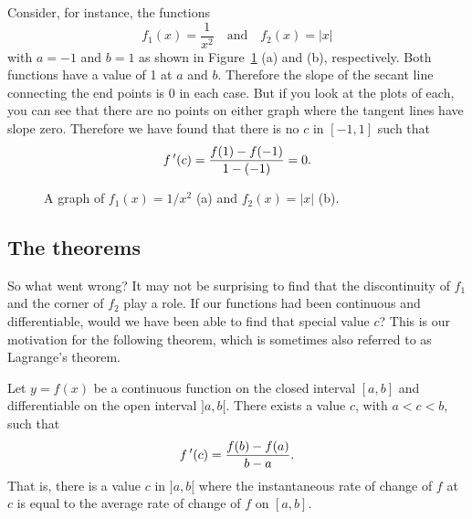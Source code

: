 Consider, for instance, the functions $$f_1(x)=\frac{1}{x^2}\quad \text{and} \quad f_2(x) = |x|$$ with $a=-1$ and $b=1$ as shown in Figure~\ref{fig_behaviour_6} (a) and (b), respectively.  Both functions have a value of 1 at $a$ and $b$.  Therefore the slope of the secant line connecting the end points is $0$ in each case.  But if you look at the plots of each, you can see that there are no points on either graph where the tangent lines have slope zero. Therefore we have found that there is no $c$ in $[-1,1]$ such that $$f\,'(c) = \frac{f(1)-f(-1)}{1-(-1)} = 0.$$

\begin{figure}[H]
\centering
\qquad
{}
\caption{A graph of $f_1(x) = 1/x^2$ (a) and $f_2(x) = |x|$ (b). }
\label{fig_behaviour_6}
\end{figure}

\subsection{The theorems}
So what went wrong?  It may not be surprising to find that the discontinuity of $f_1$ and the corner of $f_2$ play a role.  If our functions had been continuous and differentiable, would we have been able to find that special value $c$? This is our motivation for the following theorem, which is sometimes also referred to as Lagrange's theorem. 

\begin{theorem}\label{thm:mvt}
Let $y=f(x)$ be a continuous function on the closed interval $[a,b]$ and differentiable on the open interval $]a,b[$. There exists a value $c$, with $a < c < b$, such that 
$$
f\,'(c) = \frac{f(b)-f(a)}{b-a}.
$$
That is, there is a value $c$ in $]a,b[$ where the instantaneous rate of change of $f$ at $c$ is equal to the average rate of change of $f$ on $[a,b]$.
\end{theorem}

